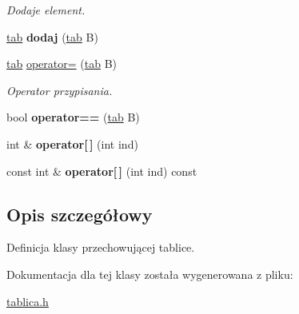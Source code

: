 \begin{DoxyCompactItemize}
\begin{DoxyCompactList}\small\item\em \-Dodaje element. \end{DoxyCompactList}\item 
\hypertarget{classtab_a90dc8cfffe8244a6ae1218fd0444f399}{\hyperlink{classtab}{tab} {\bfseries dodaj} (\hyperlink{classtab}{tab} \-B)}\label{classtab_a90dc8cfffe8244a6ae1218fd0444f399}

\item 
\hypertarget{classtab_a05351f5dbd8a13885d98b3165245e498}{\hyperlink{classtab}{tab} \hyperlink{classtab_a05351f5dbd8a13885d98b3165245e498}{operator=} (\hyperlink{classtab}{tab} \-B)}\label{classtab_a05351f5dbd8a13885d98b3165245e498}

\begin{DoxyCompactList}\small\item\em \-Operator przypisania. \end{DoxyCompactList}\item 
\hypertarget{classtab_a82eda0243a55cc93e412c46c1eef1b49}{bool {\bfseries operator==} (\hyperlink{classtab}{tab} \-B)}\label{classtab_a82eda0243a55cc93e412c46c1eef1b49}

\item 
\hypertarget{classtab_a3c549759a4a4870aa49c798c05915e2b}{int \& {\bfseries operator\mbox{[}$\,$\mbox{]}} (int ind)}\label{classtab_a3c549759a4a4870aa49c798c05915e2b}

\item 
\hypertarget{classtab_aa0611573459a2dad5500d8315ef6fccc}{const int \& {\bfseries operator\mbox{[}$\,$\mbox{]}} (int ind) const }\label{classtab_aa0611573459a2dad5500d8315ef6fccc}

\end{DoxyCompactItemize}


\subsection{\-Opis szczegółowy}
\-Definicja klasy przechowującej tablice. 

\-Dokumentacja dla tej klasy została wygenerowana z pliku\-:\begin{DoxyCompactItemize}
\item 
\hyperlink{tablica_8h}{tablica.\-h}\end{DoxyCompactItemize}
